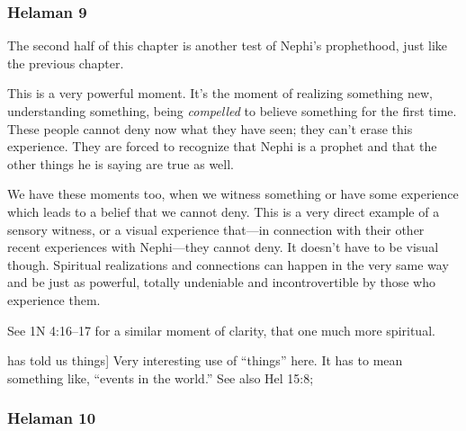 	\subsubsection{Helaman 9} %
	
		The second half of this chapter is another test of Nephi's prophethood, just like the previous chapter.
	
		\begin{compactdesc}
		
		\item[5$\vert$]
		\begin{compactdesc}
		\item[when they saw they believed] This is a very powerful moment. It's the moment of realizing something new, understanding something, being \textit{compelled} to believe something for the first time. These people cannot deny now what they have seen; they can't erase this experience. They are forced to recognize that Nephi is a prophet and that the other things he is saying are true as well. 
		
		We have these moments too, when we witness something or have some experience which leads to a belief that we cannot deny. This is a very direct example of a sensory witness, or a visual experience that---in connection with their other recent experiences with Nephi---they cannot deny. It doesn't have to be visual though. Spiritual realizations and connections can happen in the very same way and be just as powerful, totally undeniable and incontrovertible by those who experience them.
		
		See 1N 4:16--17 for a similar moment of clarity, that one much more spiritual.
		\end{compactdesc}
		
		\item[41$\vert$]
		\begin{compactdesc}
		\item[[he] has told us things] Very interesting use of ``things'' here. It has to mean something like, ``events in the world.'' See also Hel 15:8; %
		\end{compactdesc} 
		
		\end{compactdesc} 
		
	\subsubsection{Helaman 10} %
	
